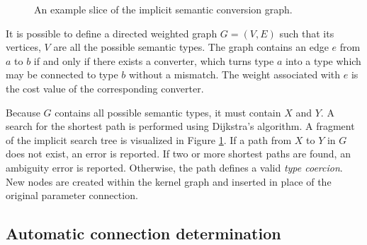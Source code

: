 \begin{figure}[h!]
  \centering
    \caption[Implicit semantic search tree]{An example slice of the implicit semantic conversion graph.}
  \label{fig:SemanticSearchGraph}
\end{figure}

It is possible to define a directed weighted graph $G=(V, E)$ such that its vertices, $V$ are all the possible semantic types. The graph contains an edge $e$ from $a$ to $b$ if and only if there exists a converter, which turns type $a$ into a type which may be connected to type $b$ without a mismatch. The weight associated with $e$ is the cost value of the corresponding converter.

Because $G$ contains all possible semantic types, it must contain $X$ and $Y$. A search for the shortest path is performed using Dijkstra's algorithm. A fragment of the implicit search tree is visualized in Figure \ref{fig:SemanticSearchGraph}. If a path from $X$ to $Y$ in $G$ does not exist, an error is reported. If two or more shortest paths are found, an ambiguity error is reported. Otherwise, the path defines a valid \emph{type coercion}. New nodes are created within the kernel graph and inserted in place of the original parameter connection.
	
\subsection{Automatic connection determination}


